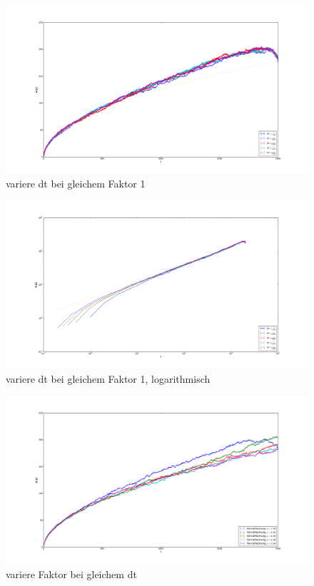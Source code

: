 \documentclass[
  a4paper,BCOR10mm,oneside,
  bibtotoc,idxtotoc,
  headsepline,footsepline,%
  fleqn,openbib
]{scrbook}
\begin{document}
\begin{figure}[h]
\includegraphics[width=\textwidth]{./dt_variert_bei_factor_1_lin.pdf}
\caption{variere dt bei gleichem Faktor 1}
 \centering
\end{figure}

\begin{figure}[h]
\includegraphics[width=\textwidth]{./dt_variert_bei_factor_1_log.pdf}
\caption{variere dt bei gleichem Faktor 1, logarithmisch}
 \centering
\end{figure}

\begin{figure}[h]
\includegraphics[width=\textwidth]{./faktor_variert_bei_dt_1_lin.pdf}
\caption{variere Faktor bei gleichem dt}
 \centering
\end{figure}
\end{document}
